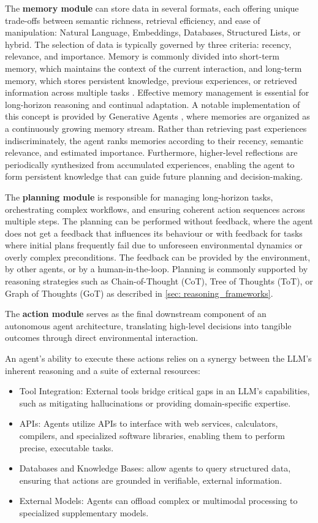 The \textbf{memory module} can store data in several formats, each offering unique trade-offs between semantic richness, retrieval efficiency, and ease of manipulation: Natural Language, Embeddings, Databases, Structured Lists, or hybrid. The selection of data is typically governed by three criteria: recency, relevance, and importance. Memory is commonly divided into short-term memory, which maintains the context of the current interaction, and long-term memory, which stores persistent knowledge, previous experiences, or retrieved information across multiple tasks \cite{wang2024survey}. Effective memory management is essential for long-horizon reasoning and continual adaptation. A notable implementation of this concept is provided by Generative Agents \cite{10.1145/3586183.3606763}, where memories are organized as a continuously growing memory stream. Rather than retrieving past experiences indiscriminately, the agent ranks memories according to their recency, semantic relevance, and estimated importance. Furthermore, higher-level reflections are periodically synthesized from accumulated experiences, enabling the agent to form persistent knowledge that can guide future planning and decision-making.


The \textbf{planning module} is responsible for managing long-horizon tasks, orchestrating complex workflows, and ensuring coherent action sequences across multiple steps. The planning can be performed without feedback, where the agent does not get a feedback that influences its behaviour or with feedback for tasks where initial plans frequently fail due to unforeseen environmental dynamics or overly complex preconditions. The feedback can be provided by the environment, by other agents, or by a human-in-the-loop. Planning is commonly supported by reasoning strategies such as Chain-of-Thought (CoT), Tree of Thoughts (ToT), or Graph of Thoughts (GoT) as described in \ref{sec: reasoning_frameworks}.


The \textbf{action module} serves as the final downstream component of an autonomous agent architecture, translating high-level decisions into tangible outcomes through direct environmental interaction.

An agent's ability to execute these actions relies on a synergy between the LLM's inherent reasoning and a suite of external resources:

\begin{itemize}
    \item Tool Integration: External tools bridge critical gaps in an LLM's capabilities, such as mitigating hallucinations or providing domain-specific expertise.
    \item APIs: Agents utilize APIs to interface with web services, calculators, compilers, and specialized software libraries, enabling them to perform precise, executable tasks.
    \item Databases and Knowledge Bases: allow agents to query structured data, ensuring that actions are grounded in verifiable, external information.
    \item External Models: Agents can offload complex or multimodal processing to specialized supplementary models.
\end{itemize}

